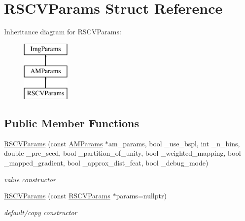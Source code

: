 \hypertarget{structRSCVParams}{\section{R\-S\-C\-V\-Params Struct Reference}
\label{structRSCVParams}
}
Inheritance diagram for R\-S\-C\-V\-Params\-:\begin{figure}[H]
\begin{center}
\leavevmode
\includegraphics[height=3.000000cm]{structRSCVParams}
\end{center}
\end{figure}
\subsection*{Public Member Functions}
\begin{DoxyCompactItemize}
\item 
\hypertarget{structRSCVParams_aa0d3faa70b8088967950256bb7d1d1c0}{\hyperlink{structRSCVParams_aa0d3faa70b8088967950256bb7d1d1c0}{R\-S\-C\-V\-Params} (const \hyperlink{structAMParams}{A\-M\-Params} $\ast$am\-\_\-params, bool \-\_\-use\-\_\-bspl, int \-\_\-n\-\_\-bins, double \-\_\-pre\-\_\-seed, bool \-\_\-partition\-\_\-of\-\_\-unity, bool \-\_\-weighted\-\_\-mapping, bool \-\_\-mapped\-\_\-gradient, bool \-\_\-approx\-\_\-dist\-\_\-feat, bool \-\_\-debug\-\_\-mode)}\label{structRSCVParams_aa0d3faa70b8088967950256bb7d1d1c0}

\begin{DoxyCompactList}\small\item\em value constructor \end{DoxyCompactList}\item 
\hypertarget{structRSCVParams_addd6cd24344dfc1383ab659943bf0691}{\hyperlink{structRSCVParams_addd6cd24344dfc1383ab659943bf0691}{R\-S\-C\-V\-Params} (const \hyperlink{structRSCVParams}{R\-S\-C\-V\-Params} $\ast$params=nullptr)}\label{structRSCVParams_addd6cd24344dfc1383ab659943bf0691}

\begin{DoxyCompactList}\small\item\em default/copy constructor \end{DoxyCompactList}\end{DoxyCompactItemize}
